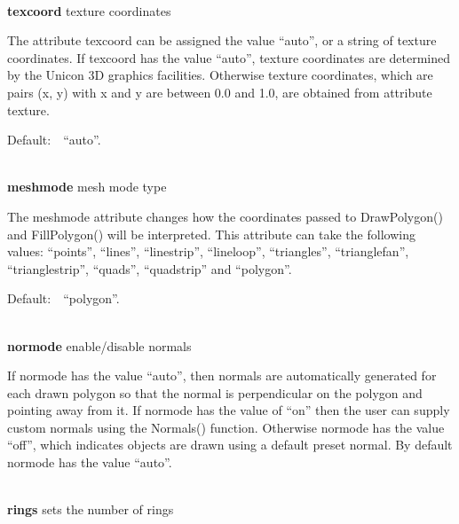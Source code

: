 \documentclass[letterpaper]{article}
\begin{document}
\bigskip

\noindent\hrulefill\\
\noindent\textsf{\textbf{texcoord}} \hfill texture coordinates


\bigskip

The attribute \textsf{texcoord} can be assigned the value \textsf{{}``auto'',} or a string of texture coordinates. If
\textsf{texcoord} has the value \textsf{{}``auto'',} texture coordinates are determined by the Unicon 3D graphics
facilities. Otherwise texture coordinates, which are pairs (x, y) with x and y are between 0.0 and 1.0, are obtained
from attribute \textsf{texture}.


\bigskip

Default:\ \ \textsf{{}``auto''}.

\noindent\hrulefill\\
\noindent\textsf{\textbf{meshmode}} \hfill mesh mode type


\bigskip

The \textsf{meshmode} attribute changes how the coordinates passed to
\textsf{DrawPolygon()} and \textsf{FillPolygon()} will be interpreted.
This attribute can take the following values: \textsf{{}``points''},
\textsf{{}``lines''}, \textsf{{}``linestrip''}, \textsf{{}``lineloop''},
\textsf{{}``triangles''}, \textsf{{}``trianglefan''},
\textsf{{}``trianglestrip''}, \textsf{{}``quads''},
\textsf{{}``quadstrip''} and \textsf{{}``polygon''}.


\bigskip

Default:\ \ \textsf{{}``polygon''}.


\bigskip

\noindent\hrulefill\\
\noindent\textsf{\textbf{normode}} \hfill enable/disable normals


\bigskip

If normode has the value \textsf{{}``auto''}, then normals are
automatically generated for each drawn polygon so that the normal is
perpendicular on the polygon and pointing away from it. If normode has
the value of ``on'' then the user can supply custom normals using the
\textsf{Normals()} function. Otherwise normode has the value
\textsf{{}``off''}, which indicates objects are drawn using a default
preset normal. By default normode has the value \textsf{{}``auto''.}

\noindent\hrulefill\\
\noindent\textsf{\textbf{rings}} \hfill sets the number of rings


\bigskip
\end{document}
